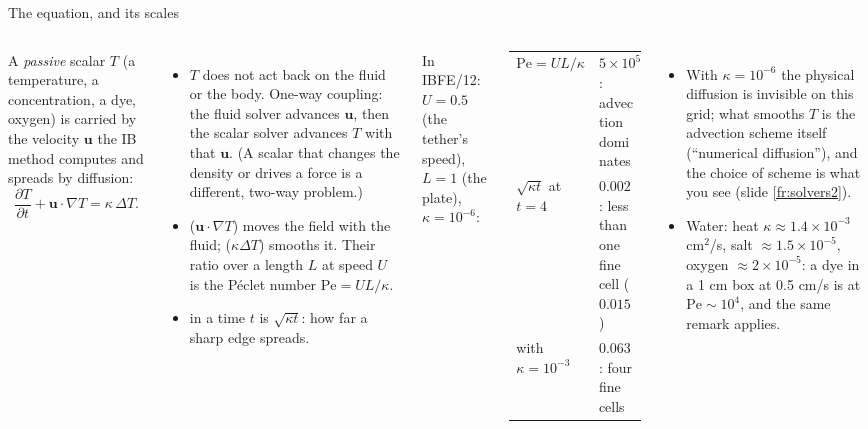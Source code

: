 \documentclass[aspectratio=169,11pt]{beamer}
\begin{document}
\begin{frame}{The equation, and its scales}
\label{fr:equation}
\footnotesize
\begin{columns}[T]
A \emph{passive} scalar $T$ (a temperature, a concentration, a dye, oxygen) is carried by the velocity $\mathbf{u}$ the IB method computes and spreads by diffusion:
\[ \frac{\partial T}{\partial t} + \mathbf{u}\cdot\nabla T = \kappa\,\Delta T . \]
\begin{itemize}
  \item {} $T$ does not act back on the fluid or the body. One-way coupling: the fluid solver advances $\mathbf{u}$, then the scalar solver advances $T$ with that $\mathbf{u}$. (A scalar that changes the density or drives a force is a different, two-way problem.)
  \item {} ($\mathbf{u}\cdot\nabla T$) moves the field with the fluid;  ($\kappa\Delta T$) smooths it. Their ratio over a length $L$ at speed $U$ is the P\'eclet number $\mathrm{Pe} = UL/\kappa$.
  \item {} in a time $t$ is $\sqrt{\kappa t}$: how far a sharp edge spreads.
\end{itemize}
In IBFE/12: $U = 0.5$ (the tether's speed), $L = 1$ (the plate), $\kappa = 10^{-6}$:
\begin{tabular}{@{}L{0.42\textwidth}L{0.5\textwidth}@{}}
\toprule
$\mathrm{Pe} = UL/\kappa$ & $5\times10^5$: advection dominates \\
$\sqrt{\kappa t}$ at $t = 4$ & $0.002$: less than one fine cell ($0.0156$) \\
with $\kappa = 10^{-3}$ & $0.063$: four fine cells \\
\bottomrule
\end{tabular}

\medskip
\begin{itemize}
  \item With $\kappa = 10^{-6}$ the physical diffusion is invisible on this grid; what smooths $T$ is the advection scheme itself (``numerical diffusion''), and the choice of scheme is what you see (slide \ref{fr:solvers2}).
  \item Water: heat $\kappa \approx 1.4\times10^{-3}$ cm$^2$/s, salt $\approx 1.5\times10^{-5}$, oxygen $\approx 2\times10^{-5}$: a dye in a 1 cm box at 0.5 cm/s is at $\mathrm{Pe} \sim 10^4$, and the same remark applies.
\end{itemize}
\end{columns}
\end{frame}
\end{document}
